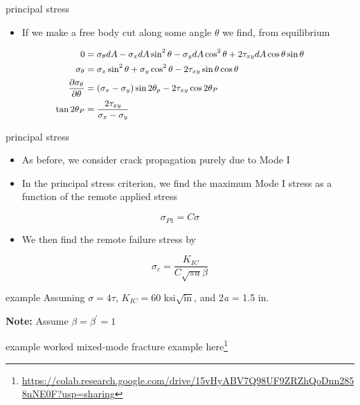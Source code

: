 \documentclass[
  letterpaper,
  ignorenonframetext,
  aspectratio=43,
  handout,
  12pt]{beamer}
\DeclareRobustCommand{\href}[2]{#2\footnote{\url{#1}}}
\providecommand{\tightlist}{%
  \setlength{\itemsep}{0pt}\setlength{\parskip}{0pt}}
\providecommand{\tightlist}{%
\setlength{\itemsep}{0pt}\setlength{\parskip}{0pt}}
\begin{document}
\begin{frame}{principal stress}
\protect\hypertarget{principal-stress-1}{}
\begin{itemize}
\tightlist
\item
  If we make a free body cut along some angle \(\theta\) we find, from
  equilibrium
\end{itemize}

\[\small{\begin{aligned}
      \begin{split}
  0 &= \sigma_\theta dA - \sigma_x dA \sin^2 \theta - \sigma_y dA \cos^2 \theta + 2\tau_{xy} dA \cos \theta \sin \theta\\
  \sigma_\theta &= \sigma_x \sin^2 \theta + \sigma_y \cos^2 \theta - 2 \tau_{xy} \sin \theta \cos \theta\\
  \frac{\partial \sigma_\theta}{\partial \theta} &= (\sigma_x - \sigma_y) \sin 2\theta_p - 2\tau_{xy} \cos 2\theta_P\\
  \tan 2\theta_P &= \frac{2 \tau_{xy}}{\sigma_x - \sigma_y}
  \end{split}
\end{aligned}}\]
\end{frame}

\begin{frame}{principal stress}
\protect\hypertarget{principal-stress-2}{}
\begin{itemize}
\tightlist
\item
  As before, we consider crack propagation purely due to Mode I
\item
  In the principal stress criterion, we find the maximum Mode I stress
  as a function of the remote applied stress
\end{itemize}

\[\sigma_{P1} = C\sigma\]

\begin{itemize}
\tightlist
\item
  We then find the remote failure stress by
\end{itemize}

\[\sigma_c = \frac{K_{IC}}{C\sqrt{\pi a}\beta}\]
\end{frame}

\begin{frame}{example}
\protect\hypertarget{example-2}{}
Assuming \(\sigma = 4\tau\),
\(K_{IC} = 60 \text{ ksi} \sqrt{\text{in}}\), and 2\emph{a} = 1.5 in.

\textbf{Note:} Assume \(\beta = \beta^\prime = 1\)
\end{frame}

\begin{frame}{example}
\protect\hypertarget{example-3}{}
worked mixed-mode fracture example
\href{https://colab.research.google.com/drive/15vHyABV7Q98UF9ZRZhQoDnn2858nNE0F?usp=sharing}{here}
\end{frame}
\end{document}
